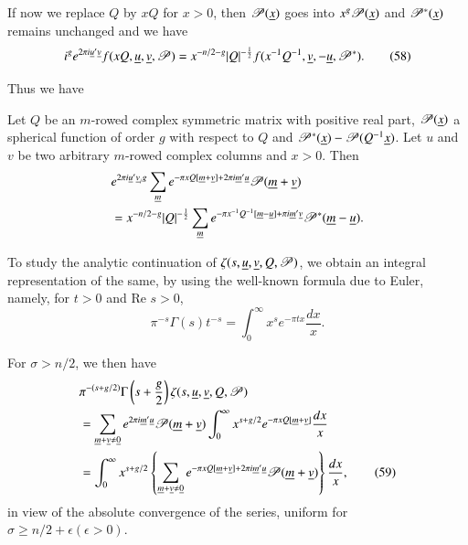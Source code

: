 If now we replace $Q$ by $x Q$ for $x>0$, then $\mathscr{P}(\underline{x})$
goes into $x^{g}\mathscr{P}(\underline{x})$ and $\mathscr{P}^{\ast}(\underline{x})$
remains unchanged and we have
\begin{equation*}
i^{g}e^{2\pi
  i\underline{u}'\underline{v}}f(xQ,\underline{u},\underline{v},\mathscr{P})=x^{-n/2-g}|Q|^{-\frac{1}{2}}f(x^{-1}Q^{-1},\underline{v},-\underline{u},\mathscr{P}^{\ast}).\tag{58}\label{58} 
\end{equation*}

Thus we have

\begin{proposition}\label{prop8}
Let $Q$ be an $m$-rowed complex symmetric matrix with positive real
part, $\mathscr{P}(\underline{x})$ a spherical function of order $g$ with
respect to $Q$ and
$\mathscr{P}^{\ast}(\underline{x})-\mathscr{P}(Q^{-1}\underline{x})$. Let $u$ and
$v$ be two arbitrary $m$-rowed complex columns and $x>0$. Then 
\begin{align*}
& e^{2\pi i\underline{u}'\underline{v}_{i}g}\sum_{\underline{m}}e^{-\pi xQ[\underline{m}+\underline{v}]+2\pi i\underline{m}'\underline{u}}\mathscr{P}(\underline{m}+\underline{v})\\
&= x^{-n/2-g}|Q|^{-\frac{1}{2}}\sum_{\underline{m}}e^{-\pi x^{-1}Q^{-1}[\underline{m}-\underline{u}]+\pi i\underline{m}'\underline{v}}\mathscr{P}^{\ast}(\underline{m}-\underline{u}).
\end{align*}\pageoriginale
\end{proposition}

To study the analytic continuation of
$\zeta(s,\underline{u},\underline{v},Q,\mathscr{P})$, we obtain an integral
representation of the same, by using the well-known formula due to
Euler, namely, for $t>0$ and $\text{Re }s>0$, 
$$
\pi^{-s}\Gamma(s)t^{-s}=\int^{\infty}_{0}x^{s}e^{-\pi tx}\frac{dx}{x}.
$$

For $\sigma>n/2$, we then have
\begin{align*}
&
  \pi^{-(s+g/2)}\Gamma\left(s+\frac{g}{2}\right)\zeta(s,\underline{u},\underline{v},Q,\mathscr{P})\\ 
& = \sum_{\underline{m}+\underline{v}\neq \underline{0}}e^{2\pi
    i\underline{m}'\underline{u}}\mathscr{P}(\underline{m}+\underline{v})\int^{\infty}_{0}x^{s+g/2}e^{-\pi
    x Q[\underline{m}+\underline{v}]}\frac{dx}{x}\\
& =\int^{\infty}_{0}x^{s+g/2}\left\{\sum_{\underline{m}+\underline{v}\neq
    \underline{0}}e^{-\pi xQ[\underline{m}+\underline{v}]+2\pi
    i\underline{m}'\underline{u}}\mathscr{P}(\underline{m}+\underline{v})\right\}\frac{dx}{x},\tag{59}\label{59} 
\end{align*}
in view of the absolute convergence of the series, uniform for
$\sigma\geq n/2+\epsilon(\epsilon>0)$.

